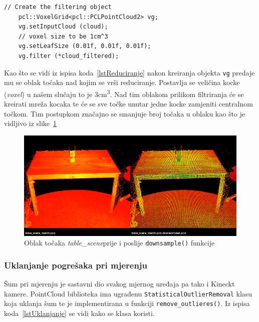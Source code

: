 \begin{lstlisting}[label=lstReduciranje, caption={Dio izvornog koda za
reduciranje točaka iz funkcije \texttt{downsample()} }]
    // Create the filtering object
    pcl::VoxelGrid<pcl::PCLPointCloud2> vg;
    vg.setInputCloud (cloud);
    // voxel size to be 1cm^3
    vg.setLeafSize (0.01f, 0.01f, 0.01f);
    vg.filter (*cloud_filtered);
\end{lstlisting}

Kao što se vidi iz ispisa koda~\ref{lstReduciranje} nakon kreiranja
objekta \texttt{vg} predaje mu se oblak točaka nad kojim se vrši
reduciranje. Postavlja se veličina kocke (\textit{voxel}) u našem
slučaju to je 3cm\textsuperscript{3}. Nad tim oblakom prilikom
filtriranja će se kreirati mreža kocaka te će se sve točke unutar jedne
kocke zamjeniti centralnom točkom. Tim postupkom značajno se smanjuje
broj točaka u oblaku kao što je vidljivo iz
slike~\ref{fig:tablescene-downsample}

\begin{figure}[h]
\centering
\includegraphics[scale=0.5]{figures/tablescene-downsampling-example.png}
\caption[description for List of Figures]{%
    Oblak točaka \textit{table\_scene}\footnotemark[2] prije i poslije %
    \texttt{downsample()} funkcije}
\label{fig:tablescene-downsample}
\end{figure}



\subsubsection{Uklanjanje pogrešaka pri mjerenju} %
\label{ssub:Uklanjanje pogrešaka pri mjerenju}
Šum pri mjerenju je sastavni dio svakog mjernog uređaja pa tako i
Kineckt kamere. PointCloud biblioteka ima ugrađenu
\texttt{StatisticalOutlierRemoval} klasu koja uklanja šum te je
implementirana u funkciji \texttt{remove\_outlieres()}.
Iz ispisa koda~\ref{lstUklanjanje} se vidi kako se klasa koristi.

